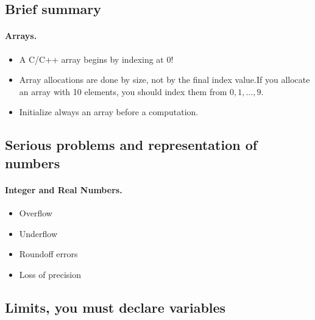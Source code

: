 \documentclass[%
oneside,                 %
final,                   %
10pt]{article}
\begin{document}
\noindent



\subsection*{Brief summary}


\paragraph{Arrays.}
\begin{itemize}
  \item A C/C++ array begins by indexing at 0!

  \item Array allocations are done by size, not by the final index value.If you allocate an array with 10 elements, you should index them from $0,1,\dots, 9$.

  \item Initialize always an array before a computation.
\end{itemize}

\noindent



\subsection*{Serious problems and representation of numbers}


\paragraph{Integer and Real Numbers.}

\begin{itemize}
  \item Overflow

  \item Underflow

  \item Roundoff errors

  \item Loss of precision
\end{itemize}

\noindent



\subsection*{Limits, you must declare variables}
\end{document}
